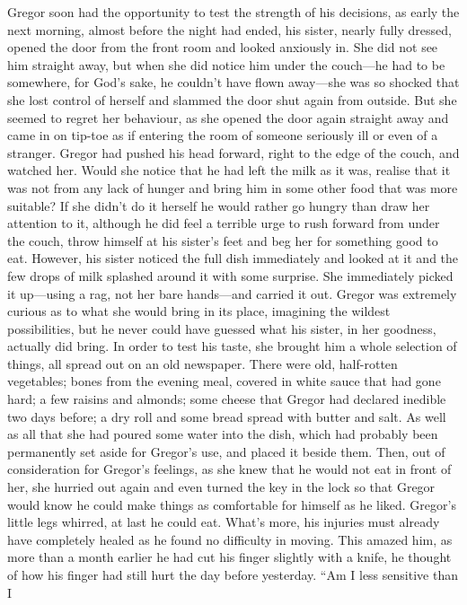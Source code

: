 Gregor soon had the opportunity to test the strength of his decisions,
as early the next morning, almost before the night had ended, his
sister, nearly fully dressed, opened the door from the front room and
looked anxiously in. She did not see him straight away, but when she
did notice him under the couch—he had to be somewhere, for God’s sake,
he couldn’t have flown away—she was so shocked that she lost control of
herself and slammed the door shut again from outside. But she seemed to
regret her behaviour, as she opened the door again straight away and
came in on tip-toe as if entering the room of someone seriously ill or
even of a stranger. Gregor had pushed his head forward, right to the
edge of the couch, and watched her. Would she notice that he had left
the milk as it was, realise that it was not from any lack of hunger and
bring him in some other food that was more suitable? If she didn’t do
it herself he would rather go hungry than draw her attention to it,
although he did feel a terrible urge to rush forward from under the
couch, throw himself at his sister’s feet and beg her for something
good to eat. However, his sister noticed the full dish immediately and
looked at it and the few drops of milk splashed around it with some
surprise. She immediately picked it up—using a rag, not her bare
hands—and carried it out. Gregor was extremely curious as to what she
would bring in its place, imagining the wildest possibilities, but he
never could have guessed what his sister, in her goodness, actually did
bring. In order to test his taste, she brought him a whole selection of
things, all spread out on an old newspaper. There were old, half-rotten
vegetables; bones from the evening meal, covered in white sauce that
had gone hard; a few raisins and almonds; some cheese that Gregor had
declared inedible two days before; a dry roll and some bread spread
with butter and salt. As well as all that she had poured some water
into the dish, which had probably been permanently set aside for
Gregor’s use, and placed it beside them. Then, out of consideration for
Gregor’s feelings, as she knew that he would not eat in front of her,
she hurried out again and even turned the key in the lock so that
Gregor would know he could make things as comfortable for himself as he
liked. Gregor’s little legs whirred, at last he could eat. What’s more,
his injuries must already have completely healed as he found no
difficulty in moving. This amazed him, as more than a month earlier he
had cut his finger slightly with a knife, he thought of how his finger
had still hurt the day before yesterday. “Am I less sensitive than I
